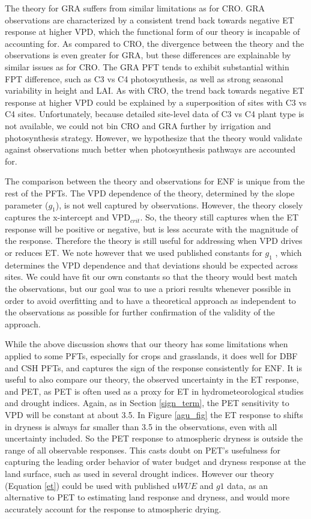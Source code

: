\documentclass[draft,linenumbers]{agujournal}
\begin{document}
The theory for GRA suffers from similar limitations as for CRO. GRA observations are characterized by a consistent trend back towards negative ET response at higher VPD, which the functional form of our theory is incapable of accounting for. As compared to CRO, the divergence between the theory and the observations is even greater for GRA, but these differences are explainable by similar issues as for CRO. The GRA PFT tends to exhibit substantial within FPT difference, such as C3 vs C4 photosynthesis, as well as strong seasonal variability in height and LAI. As with CRO, the trend back towards negative ET response at higher VPD could be explained by a superposition of sites with C3 vs C4 sites. Unfortunately, because detailed site-level data of C3 vs C4 plant type is not available, we could not bin CRO and GRA further by irrigation and photosynthesis strategy. However, we hypothesize that the theory would validate against observations much better when photosynthesis pathways are accounted for. 

The comparison between the theory and observations for ENF is unique from the rest of the PFTs. The VPD dependence of the theory, determined by the slope parameter ($g_1$), is not well captured by observations. However, the theory closely captures the x-intercept and VPD$_{crit}$. So, the theory still captures when the ET response will be positive or negative, but is less accurate with the magnitude of the response. Therefore the theory is still useful for addressing when VPD drives or reduces ET. We note however that we used published constants for $g_1$ \citep[from ][]{Lin_2015}, which determines the VPD dependence and that deviations should be expected across sites. We could have fit our own constants so that the theory would best match the observations, but our goal was to use a priori results whenever possible in order to avoid overfitting and to have a theoretical approach as independent to the observations as possible for further confirmation of the validity of the approach.

While the above discussion shows that our theory has some limitations when applied to some PFTs, especially for crops and grasslands, it does well for DBF and CSH PFTs, and captures the sign of the response consistently for ENF. It is useful to also compare our theory, the observed uncertainty in the ET response, and PET, as PET is often used as a proxy for ET in hydrometeorological studies and drought indices. Again, as in Section \ref{sign_term}, the PET sensitivity to VPD will be constant at about 3.5. In Figure \ref{agu_fig} the ET response to shifts in dryness is always far smaller than 3.5 in the observations, even with all uncertainty included. So the PET response to atmospheric dryness is outside the range of all observable responses. This casts doubt on PET's usefulness for capturing the leading order behavior of water budget and dryness response at the land surface, such as used in several drought indices. However our theory (Equation \ref{et}) could be used with published $uWUE$ and $g1$ data, as an alternative to PET to estimating land response and dryness, and would more accurately account for the response to atmospheric drying.
\end{document}
